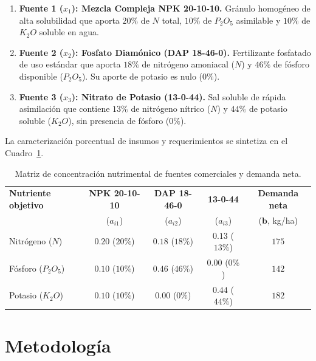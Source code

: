 \begin{enumerate}

    \item \textbf{Fuente 1 ($x_1$): Mezcla Compleja NPK 20-10-10.} Gránulo homogéneo de alta solubilidad que aporta $20\%$ de $N$ total, $10\%$ de $P_2O_5$ asimilable y $10\%$ de $K_2O$ soluble en agua.

    \item \textbf{Fuente 2 ($x_2$): Fosfato Diamónico (DAP 18-46-0).} Fertilizante fosfatado de uso estándar que aporta $18\%$ de nitrógeno amoniacal ($N$) y $46\%$ de fósforo disponible ($P_2O_5$). Su aporte de potasio es nulo ($0\%$).

    \item \textbf{Fuente 3 ($x_3$): Nitrato de Potasio (13-0-44).} Sal soluble de rápida asimilación que contiene $13\%$ de nitrógeno nítrico ($N$) y $44\%$ de potasio soluble ($K_2O$), sin presencia de fósforo ($0\%$).

\end{enumerate}

La caracterización porcentual de insumos y requerimientos se sintetiza en el Cuadro~\ref{tab:datos_fertilizacion}.

\begin{table}[H]
\centering
\caption{Matriz de concentración nutrimental de fuentes comerciales y demanda neta.}\label{tab:datos_fertilizacion}
\begin{AulatexTable}[\linewidth]
\small
\begin{tabularx}{\linewidth}{@{}>{\raggedright\arraybackslash}Xcccc@{}}
\toprule
\textbf{Nutriente objetivo} & \textbf{NPK 20-10-10} & \textbf{DAP 18-46-0} & \textbf{13-0-44} & \textbf{Demanda neta} \\
& ($a_{i1}$) & ($a_{i2}$) & ($a_{i3}$) & ($\mathbf{b}$, kg/ha) \\
\midrule
Nitrógeno ($N$) & $0.20$ ($20\%$) & $0.18$ ($18\%$) & $0.13$ ($13\%$) & $175$ \\
Fósforo ($P_2O_5$) & $0.10$ ($10\%$) & $0.46$ ($46\%$) & $0.00$ ($0\%$) & $142$ \\
Potasio ($K_2O$) & $0.10$ ($10\%$) & $0.00$ ($0\%$) & $0.44$ ($44\%$) & $182$ \\
\bottomrule
\end{tabularx}
\end{AulatexTable}
\end{table}
\FloatBarrier

\section{Metodología}

